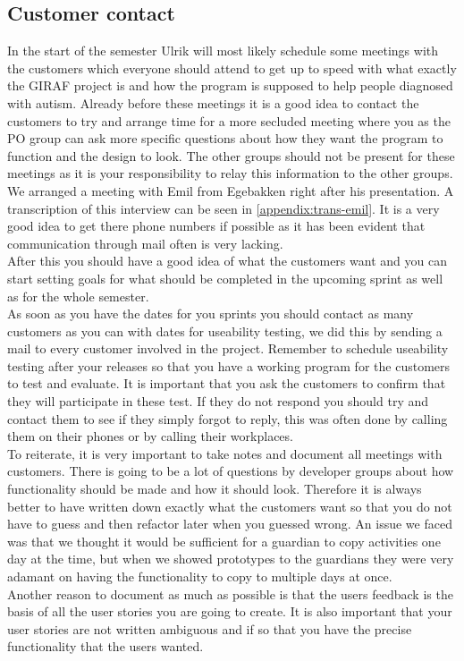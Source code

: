 \subsection{Customer contact}
In the start of the semester Ulrik will most likely schedule some meetings with the customers which everyone should attend to get up to speed with what exactly the GIRAF project is and how the program is supposed to help people diagnosed with autism.
Already before these meetings it is a good idea to contact the customers to try and arrange time for a more secluded meeting where you as the PO group can ask more specific questions about how they want the program to function and the design to look.
The other groups should not be present for these meetings as it is your responsibility to relay this information to the other groups.
We arranged a meeting with Emil from Egebakken right after his presentation. 
A transcription of this interview can be seen in \autoref{appendix:trans-emil}.
It is a very good idea to get there phone numbers if possible as it has been evident that communication through mail often is very lacking.
\\
After this you should have a good idea of what the customers want and you can start setting goals for what should be completed in the upcoming sprint as well as for the whole semester.
\\
As soon as you have the dates for you sprints you should contact as many customers as you can with dates for useability testing, we did this by sending a mail to every customer involved in the project.
Remember to schedule useability testing after your releases so that you have a working program for the customers to test and evaluate.
It is important that you ask the customers to confirm that they will participate in these test.
If they do not respond you should try and contact them to see if they simply forgot to reply, this was often done by calling them on their phones or by calling their workplaces.
\\
To reiterate, it is very important to take notes and document all meetings with customers.
There is going to be a lot of questions by developer groups about how functionality should be made and how it should look.
Therefore it is always better to have written down exactly what the customers want so that you do not have to guess and then refactor later when you guessed wrong.
An issue we faced was that we thought it would be sufficient for a guardian to copy activities one day at the time, but when we showed prototypes to the guardians they were very adamant on having the functionality to copy to multiple days at once.
\\
Another reason to document as much as possible is that the users feedback is the basis of all the user stories you are going to create.
It is also important that your user stories are not written ambiguous and if so that you have the precise functionality that the users wanted.

